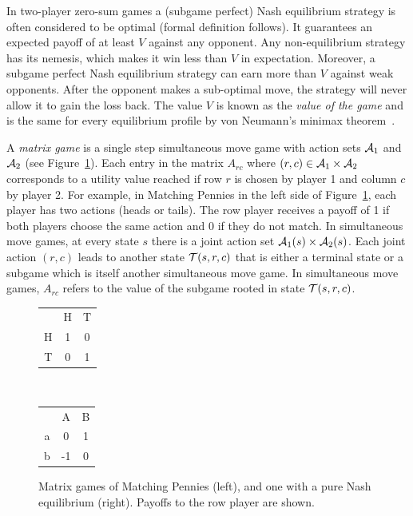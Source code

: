 In two-player zero-sum games a (subgame perfect) Nash equilibrium strategy is often considered to be optimal (formal definition follows).
It guarantees an expected payoff of at least $V$ against any opponent. Any non-equilibrium strategy has its nemesis, which makes it win less
than $V$ in expectation. Moreover, a subgame perfect Nash equilibrium strategy can earn more than $V$ against weak opponents. After the
opponent makes a sub-optimal move, the strategy will never allow it to gain the loss back.
The value $V$ is known as the \emph{value of the game} and is the same for every equilibrium profile by von Neumann's minimax theorem~\cite{VonNeumann1928}.

A {\it matrix game} is a single step simultaneous move game with action sets $\mathcal{A}_1$ and $\mathcal{A}_2$ (see Figure~\ref{fig:egMatrixGames}).
Each entry in the matrix $A_{rc}$ where $(r,c) \in \mathcal{A}_1 \times \mathcal{A}_2$ corresponds to a utility value reached if row $r$ is chosen by player 1 and column $c$ by player 2.
For example, in Matching Pennies in the left side of Figure~\ref{fig:egMatrixGames}, each player has two actions (heads or tails).
The row player receives a payoff of 1
if both players choose the same action and 0 if they do not match.
In simultaneous move games, at every state $s$ there is a joint action set $\mathcal{A}_1(s) \times \mathcal{A}_2(s)$.
Each joint action $(r,c)$ leads to another state $\mathcal{T}(s,r,c)$ that is either a terminal state or a subgame which is itself another simultaneous move game.
In simultaneous move games, $A_{rc}$ refers to the value of the subgame rooted in state $\mathcal{T}(s,r,c)$.

\begin{figure}[t!]
\centering
\begin{tabular}{c|c|c|}
 \multicolumn{1}{c}{~} & \multicolumn{1}{c}{H}  &  \multicolumn{1}{c}{T}\\\cline{2-3}
H &  1  &  0\\\cline{2-3}
T  & 0  &  1\\\cline{2-3}
\end{tabular}
~~~~~~~~~
\begin{tabular}{c|c|c|}
 \multicolumn{1}{c}{~} & \multicolumn{1}{c}{A}  &  \multicolumn{1}{c}{B}\\\cline{2-3}
a &  0  &  1\\\cline{2-3}
b & -1  &  0\\\cline{2-3}
\end{tabular}
\caption{Matrix games of Matching Pennies (left), and one with a pure Nash equilibrium (right).
Payoffs to the row player are shown. \label{fig:egMatrixGames}}
\end{figure}


